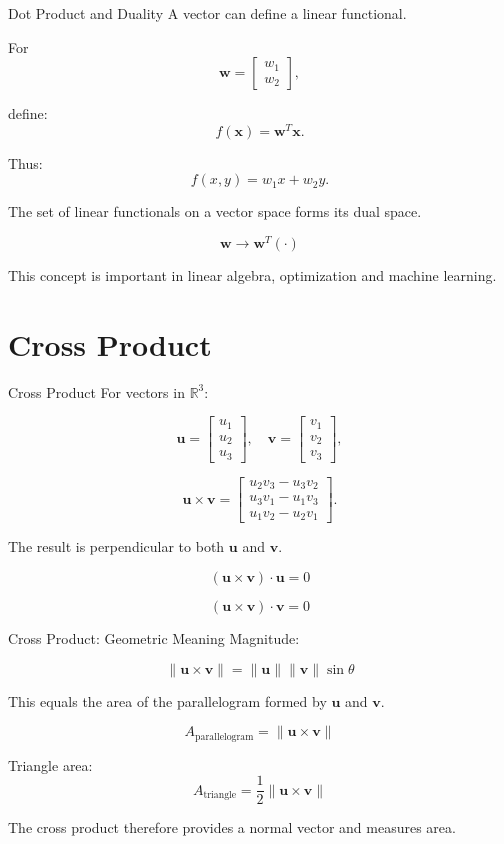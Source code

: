 \documentclass[aspectratio=169]{beamer}
\begin{document}
\begin{frame}{Dot Product and Duality}
A vector can define a linear functional.

For
\[
\mathbf w=
\begin{bmatrix}w_1\\w_2\end{bmatrix},
\]

define:
\[
f(\mathbf x)=\mathbf w^T\mathbf x.
\]

Thus:
\[
f(x,y)=w_1x+w_2y.
\]

The set of linear functionals on a vector space forms its dual space.

\[
\boxed{
\mathbf w\longrightarrow
\mathbf w^T(\cdot)
}
\]

This concept is important in linear algebra, optimization and machine learning.
\end{frame}

\section{Cross Product}

\begin{frame}{Cross Product}
For vectors in $\mathbb R^3$:

\[
\mathbf u=
\begin{bmatrix}u_1\\u_2\\u_3\end{bmatrix},
\quad
\mathbf v=
\begin{bmatrix}v_1\\v_2\\v_3\end{bmatrix},
\]

\[
\mathbf u\times\mathbf v=
\begin{bmatrix}
u_2v_3-u_3v_2\\
u_3v_1-u_1v_3\\
u_1v_2-u_2v_1
\end{bmatrix}.
\]

The result is perpendicular to both $\mathbf u$ and $\mathbf v$.

\[
\boxed{
(\mathbf u\times\mathbf v)\cdot\mathbf u=0
}
\]

\[
\boxed{
(\mathbf u\times\mathbf v)\cdot\mathbf v=0
}
\]
\end{frame}

\begin{frame}{Cross Product: Geometric Meaning}
Magnitude:

\[
\boxed{
\|\mathbf u\times\mathbf v\|
=
\|\mathbf u\|\|\mathbf v\|\sin\theta
}
\]

This equals the area of the parallelogram formed by $\mathbf u$ and $\mathbf v$.

\[
\boxed{
A_{\text{parallelogram}}
=
\|\mathbf u\times\mathbf v\|
}
\]

Triangle area:
\[
\boxed{
A_{\text{triangle}}
=
\frac12\|\mathbf u\times\mathbf v\|
}
\]

The cross product therefore provides a normal vector and measures area.
\end{frame}
\end{document}
